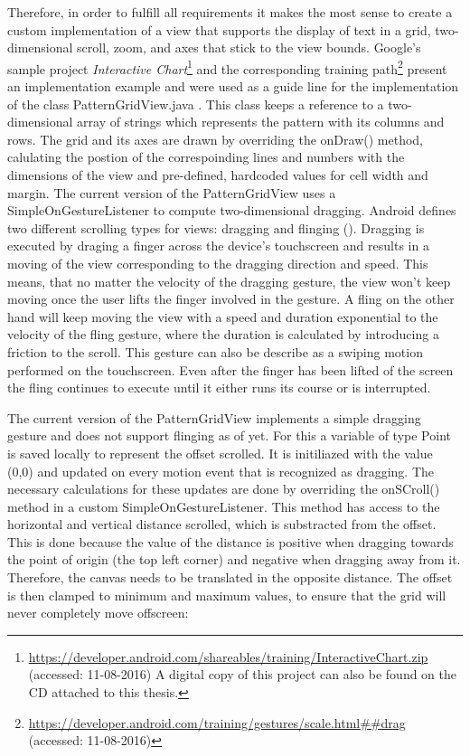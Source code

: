 Therefore, in order to fulfill all requirements it makes the most sense to create a custom implementation of a view that supports the display of text in a grid, two-dimensional scroll, zoom, and axes that stick to the view bounds. Google's sample project \textit{Interactive Chart}\footnote{\url{https://developer.android.com/shareables/training/InteractiveChart.zip} (accessed: 11-08-2016) A digital copy of this project can also be found on the CD attached to this thesis.} and the corresponding training path\footnote{\url{https://developer.android.com/training/gestures/scale.html##drag} (accessed: 11-08-2016)} present an implementation example and were used as a guide line for the implementation of the class PatternGridView.java . This class keeps a reference to a two-dimensional array of strings which represents the pattern with its columns and rows. The grid and its axes are drawn by overriding the onDraw() method, calulating the postion of the correspoinding lines and numbers with the dimensions of the view and pre-defined, hardcoded values for cell width and margin. The current version of the PatternGridView uses a SimpleOnGestureListener to compute two-dimensional dragging. Android defines two different scrolling types for views: dragging and flinging (\cite{android_scrolling_types}). Dragging is executed by draging a finger across the device's touchscreen and results in a moving of the view corresponding to the dragging direction and speed. This means, that no matter the velocity of the dragging gesture, the view won't keep moving once the user lifts the finger involved in the gesture. A fling on the other hand will keep moving the view with a speed and duration exponential to the velocity of the fling gesture, where the duration is calculated by introducing a friction to the scroll. This gesture can also be describe as a swiping motion performed on the touchscreen. Even after the finger has been lifted of the screen the fling continues to execute until it either runs its course or is interrupted.

The current version of the PatternGridView implements a simple dragging gesture and does not support flinging as of yet. For this a variable of type Point is saved locally to represent the offset scrolled. It is initiliazed with the value (0,0) and updated on every motion event that is recognized as dragging. The necessary calculations for these updates are done by overriding the onSCroll() method in a custom SimpleOnGestureListener. This method has access to the horizontal and vertical distance scrolled, which is substracted from the offset. This is done because the value of the distance is positive when dragging towards the point of origin (the top left corner) and negative when dragging away from it. Therefore, the canvas needs to be translated in the opposite distance. The offset is then clamped to minimum and maximum values, to ensure that the grid will never completely move offscreen: 

